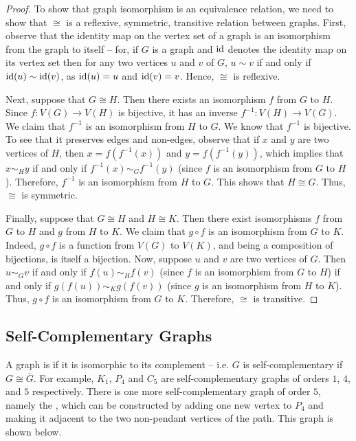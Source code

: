\begin{proof}
To show that graph isomorphism is an equivalence relation, we need to show that $\cong$ is a reflexive, symmetric, transitive relation between graphs. First, observe that the identity map on the vertex set of a graph is an isomorphism from the graph to itself -- for, if $G$ is a graph and $\mathrm{id}$ denotes the identity map on its vertex set then for any two vertices $u$ and $v$ of $G$, $u \sim v$ if and only if $\mathrm{id}(u) \sim \mathrm{id}(v)$, as $\mathrm{id}(u) = u$ and $\mathrm{id}(v) = v$. Hence, $\cong$ is reflexive.

Next, suppose that $G \cong H$. Then there exists an isomorphism $f$ from $G$ to $H$. Since $f \colon V(G) \to V(H)$ is bijective, it has an inverse $f^{-1} \colon V(H) \to V(G)$. We claim that $f^{-1}$ is an isomorphism from $H$ to $G$. We know that $f^{-1}$ is bijective. To see that it preserves edges and non-edges, observe that if $x$ and $y$ are two vertices of $H$, then $x = f(f^{-1}(x))$ and $y = f(f^{-1}(y))$, which implies that $x \sim_H y$ if and only if $f^{-1}(x) \sim_G f^{-1}(y)$ (since $f$ is an isomorphism from $G$ to $H$). Therefore, $f^{-1}$ is an isomorphism from $H$ to $G$. This shows that $H \cong G$. Thus, $\cong$ is symmetric.

Finally, suppose that $G \cong H$ and $H \cong K$. Then there exist isomorphisms $f$ from $G$ to $H$ and $g$ from $H$ to $K$. We claim that $g \circ f$ is an isomorphism from $G$ to $K$. Indeed, $g \circ f$ is a function from $V(G)$ to $V(K)$, and being a composition of bijections, is itself a bijection. Now, suppose $u$ and $v$ are two vertices of $G$. Then $u \sim_G v$ if and only if $f(u) \sim_H f(v)$ (since $f$ is an isomorphism from $G$ to $H$) if and only if $g(f(u)) \sim_K g(f(v))$ (since $g$ is an isomorphism from $H$ to $K$). Thus, $g \circ f$ is an isomorphism from $G$ to $K$. Therefore, $\cong$ is transitive.
\end{proof}

\subsection{Self-Complementary Graphs}\label{subsec:SC}

A graph is  if it is isomorphic to its complement -- i.e. $G$ is self-complementary if $G \cong \overline G$. For example, $K_1$, $P_4$ and $C_5$ are self-complementary graphs of orders $1$, $4$, and $5$ respectively. There is one more self-complementary graph of order $5$, namely the , which can be constructed by adding one new vertex to $P_4$ and making it adjacent to the two non-pendant vertices of the path. This graph is shown below.


